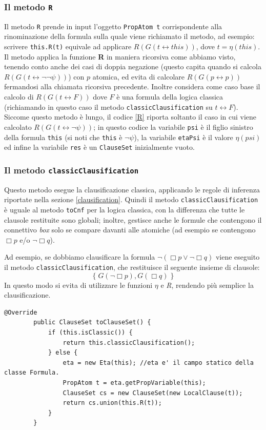 \documentclass[a4paper,12pt]{report}
\newcommand{\tto} {\leftrightarrow}
\begin{document}
\subsubsection{Il metodo \texttt{R}}
Il metodo \texttt{R} prende in input l'oggetto \texttt{PropAtom t} corrispondente alla rinominazione della formula sulla quale viene richiamato il metodo, ad esempio: scrivere \texttt{this.R(t)} equivale ad applicare $R(G(t \tto this))$, dove $t = \eta(this)$. Il metodo applica la funzione \textbf{R} in maniera ricorsiva come abbiamo visto, tenendo conto anche dei casi di doppia negazione (questo capita quando si calcola $R(G(t \tto \lnot \lnot \psi))$) con $p$ atomica, ed evita di calcolare $R(G(p \tto p))$ fermandosi alla chiamata ricorsiva precedente. Inoltre considera come caso base il calcolo di $R(G(t \tto F))$ dove $F$ è una formula della logica classica (richiamando in questo caso il metodo \texttt{classicClausification} su $t \tto F$). Siccome questo metodo è lungo, il codice \ref{R} riporta soltanto il caso in cui viene calcolato $R(G(t \tto \lnot \psi))$; in questo codice la variabile \texttt{psi} è il figlio sinistro della formula \texttt{this} (si noti che \texttt{this} è $\lnot \psi$), la variabile \texttt{etaPsi} è il valore $\eta(psi)$ ed infine la variabile \texttt{res} è un \texttt{ClauseSet} inizialmente vuoto.

\subsubsection{Il metodo \texttt{classicClausification}}
\label{classicClausification}
Questo metodo esegue la clausificazione classica, applicando le regole di inferenza riportate nella sezione \ref{clausification}. Quindi il metodo \texttt{classicClausification} è uguale al metodo \texttt{toCnf} per la logica classica, con la differenza che tutte le clausole restituite sono globali; inoltre, gestisce anche le formule che contengono il connettivo \emph{box} solo se compare davanti alle atomiche (ad esempio se contengono $\Box p$ e/o $\lnot \Box q$).

Ad esempio, se dobbiamo clausificare la formula $\lnot(\Box p \lor \lnot \Box q)$ viene eseguito il metodo \texttt{classicClausification}, che restituisce il seguente insieme di clausole:
\[
    \{ \; G(\lnot \Box p), G(\Box q) \; \}
\]
In questo modo si evita di utilizzare le funzioni $\eta$ e \emph{R}, rendendo più semplice la clausificazione.

\begin{minipage}{\linewidth}
    \begin{lstlisting}[caption={Metodo \texttt{toClauseSet} della classe \texttt{CompoundFormula}}, label={toClauseSet}]
        @Override
        public ClauseSet toClauseSet() {
            if (this.isClassic()) {
                return this.classicClausification();
            } else {
                eta = new Eta(this); //eta e' il campo statico della classe Formula.
                PropAtom t = eta.getPropVariable(this);
                ClauseSet cs = new ClauseSet(new LocalClause(t));
                return cs.union(this.R(t));
            }
        }
    \end{lstlisting}
\end{minipage}
\end{document}
